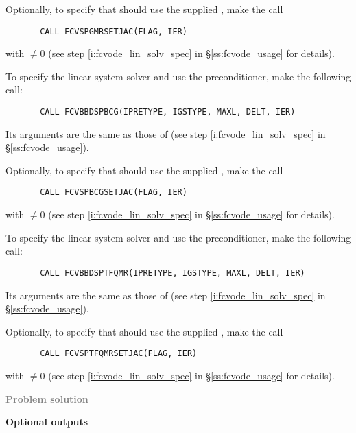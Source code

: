 \begin{Steps}
  Optionally, to specify that {\spgmr} should use the supplied , 
  make the call
\begin{verbatim}
       CALL FCVSPGMRSETJAC(FLAG, IER)
\end{verbatim}
  with  $\neq 0$ 
  (see step \ref{i:fcvode_lin_solv_spec} in \S\ref{ss:fcvode_usage} for details).
  

  To specify the {\spbcg} linear system solver and use the {\cvbbdpre}
  preconditioner, make the following call:
\begin{verbatim}
       CALL FCVBBDSPBCG(IPRETYPE, IGSTYPE, MAXL, DELT, IER)
\end{verbatim}
  Its arguments are the same as those of 
  (see step \ref{i:fcvode_lin_solv_spec} in \S\ref{ss:fcvode_usage}).
  
  Optionally, to specify that {\spbcg} should use the supplied , 
  make the call
\begin{verbatim}
       CALL FCVSPBCGSETJAC(FLAG, IER)
\end{verbatim}
  with  $\neq 0$ 
  (see step \ref{i:fcvode_lin_solv_spec} in \S\ref{ss:fcvode_usage} for details).


  To specify the {\sptfqmr} linear system solver and use the {\cvbbdpre}
  preconditioner, make the following call:
\begin{verbatim}
       CALL FCVBBDSPTFQMR(IPRETYPE, IGSTYPE, MAXL, DELT, IER)
\end{verbatim}
  Its arguments are the same as those of 
  (see step \ref{i:fcvode_lin_solv_spec} in \S\ref{ss:fcvode_usage}).
  
  Optionally, to specify that {\sptfqmr} should use the supplied , 
  make the call
\begin{verbatim}
       CALL FCVSPTFQMRSETJAC(FLAG, IER)
\end{verbatim}
  with  $\neq 0$ 
  (see step \ref{i:fcvode_lin_solv_spec} in \S\ref{ss:fcvode_usage} for details).

\item \textcolor{gray}{\bf Problem solution}
  
\item {\bf {\cvbbdpre} Optional outputs}
  

\end{Steps}
